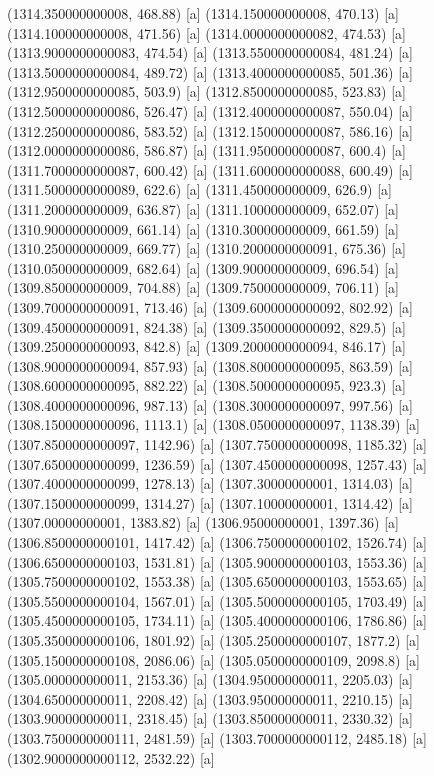 {{{(1314.350000000008, 468.88) [a] 
(1314.150000000008, 470.13) [a] 
(1314.100000000008, 471.56) [a] 
(1314.0000000000082, 474.53) [a] 
(1313.9000000000083, 474.54) [a] 
(1313.5500000000084, 481.24) [a] 
(1313.5000000000084, 489.72) [a] 
(1313.4000000000085, 501.36) [a] 
(1312.9500000000085, 503.9) [a] 
(1312.8500000000085, 523.83) [a] 
(1312.5000000000086, 526.47) [a] 
(1312.4000000000087, 550.04) [a] 
(1312.2500000000086, 583.52) [a] 
(1312.1500000000087, 586.16) [a] 
(1312.0000000000086, 586.87) [a] 
(1311.9500000000087, 600.4) [a] 
(1311.7000000000087, 600.42) [a] 
(1311.6000000000088, 600.49) [a] 
(1311.5000000000089, 622.6) [a] 
(1311.450000000009, 626.9) [a] 
(1311.200000000009, 636.87) [a] 
(1311.100000000009, 652.07) [a] 
(1310.900000000009, 661.14) [a] 
(1310.300000000009, 661.59) [a] 
(1310.250000000009, 669.77) [a] 
(1310.2000000000091, 675.36) [a] 
(1310.050000000009, 682.64) [a] 
(1309.900000000009, 696.54) [a] 
(1309.850000000009, 704.88) [a] 
(1309.750000000009, 706.11) [a] 
(1309.7000000000091, 713.46) [a] 
(1309.6000000000092, 802.92) [a] 
(1309.4500000000091, 824.38) [a] 
(1309.3500000000092, 829.5) [a] 
(1309.2500000000093, 842.8) [a] 
(1309.2000000000094, 846.17) [a] 
(1308.9000000000094, 857.93) [a] 
(1308.8000000000095, 863.59) [a] 
(1308.6000000000095, 882.22) [a] 
(1308.5000000000095, 923.3) [a] 
(1308.4000000000096, 987.13) [a] 
(1308.3000000000097, 997.56) [a] 
(1308.1500000000096, 1113.1) [a] 
(1308.0500000000097, 1138.39) [a] 
(1307.8500000000097, 1142.96) [a] 
(1307.7500000000098, 1185.32) [a] 
(1307.6500000000099, 1236.59) [a] 
(1307.4500000000098, 1257.43) [a] 
(1307.4000000000099, 1278.13) [a] 
(1307.30000000001, 1314.03) [a] 
(1307.1500000000099, 1314.27) [a] 
(1307.10000000001, 1314.42) [a] 
(1307.00000000001, 1383.82) [a] 
(1306.95000000001, 1397.36) [a] 
(1306.8500000000101, 1417.42) [a] 
(1306.7500000000102, 1526.74) [a] 
(1306.6500000000103, 1531.81) [a] 
(1305.9000000000103, 1553.36) [a] 
(1305.7500000000102, 1553.38) [a] 
(1305.6500000000103, 1553.65) [a] 
(1305.5500000000104, 1567.01) [a] 
(1305.5000000000105, 1703.49) [a] 
(1305.4500000000105, 1734.11) [a] 
(1305.4000000000106, 1786.86) [a] 
(1305.3500000000106, 1801.92) [a] 
(1305.2500000000107, 1877.2) [a] 
(1305.1500000000108, 2086.06) [a] 
(1305.0500000000109, 2098.8) [a] 
(1305.000000000011, 2153.36) [a] 
(1304.950000000011, 2205.03) [a] 
(1304.650000000011, 2208.42) [a] 
(1303.950000000011, 2210.15) [a] 
(1303.900000000011, 2318.45) [a] 
(1303.850000000011, 2330.32) [a] 
(1303.7500000000111, 2481.59) [a] 
(1303.7000000000112, 2485.18) [a] 
(1302.9000000000112, 2532.22) [a] 
}}}
